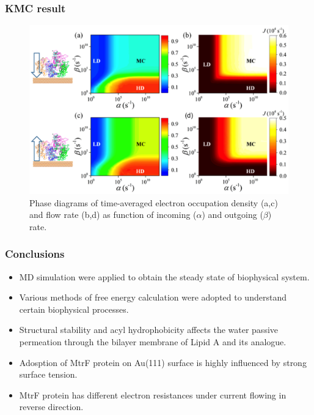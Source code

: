 \documentclass{beamer}
\begin{document}
\begin{frame}
\frametitle{KMC result}
\begin{figure}
	\includegraphics[width=\linewidth]{Pics/MtrF_KMC.png} 
	\caption{Phase diagrams of time-averaged electron occupation density (a,c) and flow rate (b,d) as function of incoming ($\alpha$) and outgoing ($\beta$) rate.}
\end{figure}
\end{frame}

\begin{frame}
\frametitle{Conclusions}
\begin{itemize}
	\item MD simulation were applied to obtain the steady state of biophysical system. 
	\item Various methods of free energy calculation were adopted to understand certain biophysical processes.  
	\item Structural stability and acyl hydrophobicity affects the water passive permeation through the bilayer membrane of Lipid A and its analogue.  
	\item Adosption of MtrF protein on Au(111) surface is highly influenced by strong surface tension. 
	\item MtrF protein has different electron resistances under current flowing in reverse direction. 
\end{itemize}
\end{frame}
\end{document}
